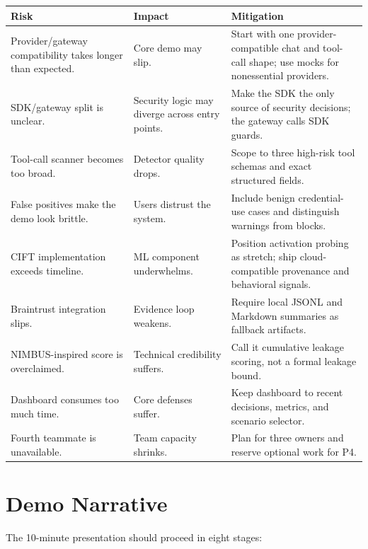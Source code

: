 \documentclass[11pt,letterpaper]{article}
\begin{document}
\begin{longtable}{p{}p{}p{}}
\toprule
\textbf{Risk} & \textbf{Impact} & \textbf{Mitigation} \\
\midrule
Provider/gateway compatibility takes longer than expected. & Core demo may slip. & Start with one provider-compatible chat and tool-call shape; use mocks for nonessential providers. \\
SDK/gateway split is unclear. & Security logic may diverge across entry points. & Make the SDK the only source of security decisions; the gateway calls SDK guards. \\
Tool-call scanner becomes too broad. & Detector quality drops. & Scope to three high-risk tool schemas and exact structured fields. \\
False positives make the demo look brittle. & Users distrust the system. & Include benign credential-use cases and distinguish warnings from blocks. \\
CIFT implementation exceeds timeline. & ML component underwhelms. & Position activation probing as stretch; ship cloud-compatible provenance and behavioral signals. \\
Braintrust integration slips. & Evidence loop weakens. & Require local JSONL and Markdown summaries as fallback artifacts. \\
NIMBUS-inspired score is overclaimed. & Technical credibility suffers. & Call it cumulative leakage scoring, not a formal leakage bound. \\
Dashboard consumes too much time. & Core defenses suffer. & Keep dashboard to recent decisions, metrics, and scenario selector. \\
Fourth teammate is unavailable. & Team capacity shrinks. & Plan for three owners and reserve optional work for P4. \\
\bottomrule
\end{longtable}

\section{Demo Narrative}

The 10-minute presentation should proceed in eight stages:
\end{document}
